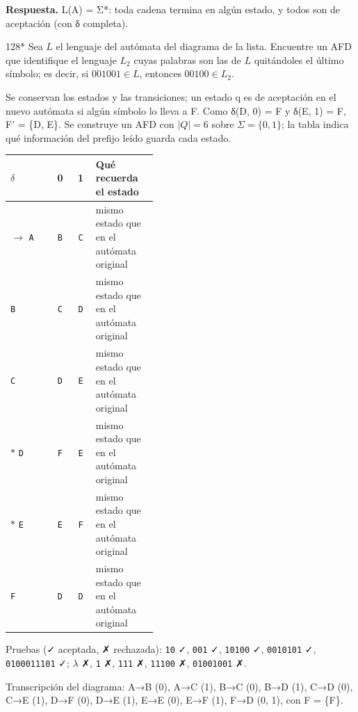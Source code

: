 \documentclass[11pt]{article}
\begin{document}
\textbf{Respuesta.} L(A) = Σ*: toda cadena termina en algún estado, y todos son de aceptación (con δ completa).



\begin{ejercicio}{128}{*}
Sea $L$ el lenguaje del autómata del diagrama de la lista. Encuentre un AFD que identifique el lenguaje $L_2$ cuyas palabras son las de $L$ quitándoles el último símbolo; es decir, si $001001 \in L$, entonces $00100 \in L_2$.
\end{ejercicio}
\proc Se conservan los estados y las transiciones; un estado q es de aceptación en el nuevo autómata si algún símbolo lo lleva a F. Como δ(D, 0) = F y δ(E, 1) = F, F' = \{D, E\}. Se construye un AFD con $|Q| = 6$ sobre $\Sigma = \{0, 1\}$; la tabla indica qué información del prefijo leído guarda cada estado.
\begin{center}\small\begin{tabular}{lccp{0.42\linewidth}}\toprule
$\delta$ & 0 & 1 & Qué recuerda el estado \\\midrule
$\to$ \texttt{A} & \texttt{B} & \texttt{C} & mismo estado que en el autómata original \\
 \texttt{B} & \texttt{C} & \texttt{D} & mismo estado que en el autómata original \\
 \texttt{C} & \texttt{D} & \texttt{E} & mismo estado que en el autómata original \\
$*$ \texttt{D} & \texttt{F} & \texttt{E} & mismo estado que en el autómata original \\
$*$ \texttt{E} & \texttt{E} & \texttt{F} & mismo estado que en el autómata original \\
 \texttt{F} & \texttt{D} & \texttt{D} & mismo estado que en el autómata original \\
\bottomrule\end{tabular}\end{center}
Pruebas (✓ aceptada, ✗ rechazada): \texttt{10} ✓, \texttt{001} ✓, \texttt{10100} ✓, \texttt{0010101} ✓, \texttt{0100011101} ✓; $\lambda$ ✗, \texttt{1} ✗, \texttt{111} ✗, \texttt{11100} ✗, \texttt{01001001} ✗.


Transcripción del diagrama: A→B (0), A→C (1), B→C (0), B→D (1), C→D (0), C→E (1), D→F (0), D→E (1), E→E (0), E→F (1), F→D (0, 1), con F = \{F\}.
\end{document}
